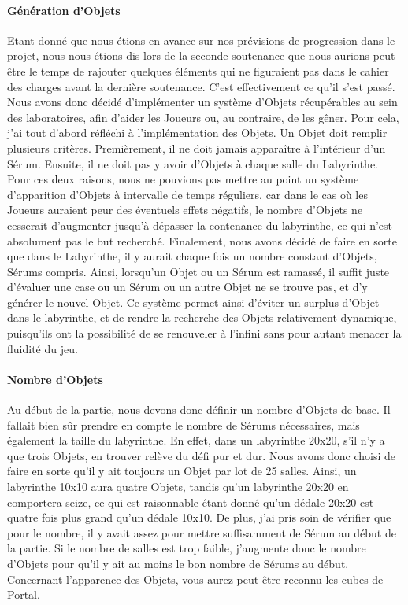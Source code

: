 \documentclass{article}
\begin{document}
\paragraph{Génération d'Objets}
Etant donné que nous étions en avance sur nos prévisions de progression dans le projet, nous nous étions dis lors de la seconde soutenance que nous aurions peut-être le temps de rajouter quelques éléments qui ne figuraient pas dans le cahier des charges avant la dernière soutenance. C'est effectivement ce qu'il s'est passé. Nous avons donc décidé d'implémenter un système d'Objets récupérables au sein des laboratoires, afin d'aider les Joueurs ou, au contraire, de les gêner. Pour cela, j'ai tout d'abord réfléchi à l'implémentation des Objets. Un Objet doit remplir plusieurs critères. Premièrement, il ne doit jamais apparaître à l'intérieur d'un Sérum. Ensuite, il ne doit pas y avoir d'Objets à chaque salle du Labyrinthe. Pour ces deux raisons, nous ne pouvions pas mettre au point un système d'apparition d'Objets à intervalle de temps réguliers, car dans le cas où les Joueurs auraient peur des éventuels effets négatifs, le nombre d'Objets ne cesserait d'augmenter jusqu'à dépasser la contenance du labyrinthe, ce qui n'est absolument pas le but recherché. Finalement, nous avons décidé de faire en sorte que dans le Labyrinthe, il y aurait chaque fois un nombre constant d'Objets, Sérums compris. Ainsi, lorsqu'un Objet ou un Sérum est ramassé, il suffit juste d'évaluer une case ou un Sérum ou un autre Objet ne se trouve pas, et d'y générer le nouvel Objet. Ce système permet ainsi d'éviter un surplus d'Objet dans le labyrinthe, et de rendre la recherche des Objets relativement dynamique, puisqu'ils ont la possibilité de se renouveler à l'infini sans pour autant menacer la fluidité du jeu. 

\paragraph{Nombre d'Objets}
Au début de la partie, nous devons donc définir un nombre d'Objets de base. Il fallait bien sûr prendre en compte le nombre de Sérums nécessaires, mais également la taille du labyrinthe. En effet, dans un labyrinthe 20x20, s'il n'y a que trois Objets, en trouver relève du défi pur et dur. Nous avons donc choisi de faire en sorte qu'il y ait toujours un Objet par lot de 25 salles. Ainsi, un labyrinthe 10x10 aura quatre Objets, tandis qu'un labyrinthe 20x20 en comportera seize, ce qui est raisonnable étant donné qu'un dédale 20x20 est quatre fois plus grand qu'un dédale 10x10. De plus, j'ai pris soin de vérifier que pour le nombre, il y avait assez pour mettre suffisamment de Sérum au début de la partie. Si le nombre de salles est trop faible, j'augmente donc le nombre d'Objets pour qu'il y ait au moins le bon nombre de Sérums au début. Concernant l'apparence des Objets, vous aurez peut-être reconnu les cubes de Portal.
\end{document}
